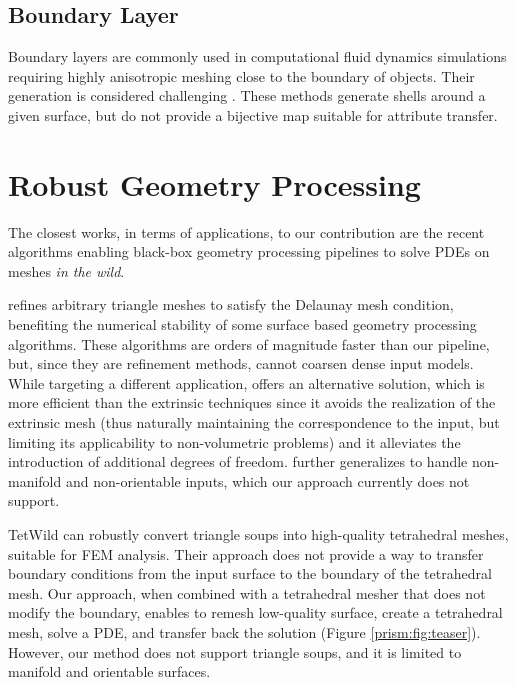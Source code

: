 \subsection{Boundary Layer}

Boundary layers are commonly used in computational fluid dynamics simulations requiring highly anisotropic meshing close to the boundary of objects. Their generation is considered challenging \cite{aubry2015most,aubry2017boundary,garimella2000boundary}. These methods generate shells around a given surface, but do not provide a bijective map suitable for attribute transfer.

\section{Robust Geometry Processing}

The closest works, in terms of applications, to our contribution are the recent algorithms enabling black-box geometry processing pipelines to solve PDEs on meshes \emph{in the wild}. 

\cite{dyer2007delaunay,liu2015efficient} refines arbitrary triangle meshes to satisfy the Delaunay mesh condition,
benefiting the numerical stability of some surface based geometry processing algorithms.
These algorithms are orders of magnitude faster than our pipeline, but, since they are refinement methods, cannot coarsen dense input models.
%
While targeting a different application, \cite{sharp2019navigating} offers an alternative solution, 
which is more efficient than the extrinsic techniques \cite{liu2015efficient} since it avoids the realization of the extrinsic mesh (thus naturally maintaining the correspondence to the input, but limiting its applicability to non-volumetric problems) and it alleviates the introduction of additional degrees of freedom.
\cite{Sharp:2020:LNT} further generalizes \cite{sharp2019navigating} to handle non-manifold and non-orientable inputs, which our approach currently does not support.


TetWild \cite{hu2018tetrahedral,Hu:2019:fTetWild}
can robustly convert triangle soups into high-quality tetrahedral meshes, suitable for FEM analysis. Their approach does not provide a way to transfer boundary conditions from the input surface to the boundary of the tetrahedral mesh. Our approach, when combined with a tetrahedral mesher that does not modify the boundary, enables to remesh low-quality surface, create a tetrahedral mesh, solve a PDE, and transfer back the solution (Figure \ref{prism:fig:teaser}). However, our method does not support triangle soups, and it is limited to manifold and orientable surfaces.

